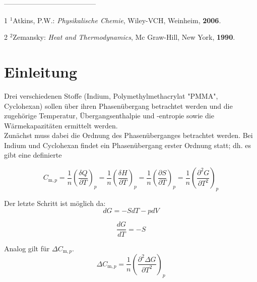 \documentclass[a4paper,12pt,oneside,onecolum,final,openany]{report}
\begin{document}
\begin{titlepage}
\vspace{1.3cm} 
 ---------------------------------------
\begin{tablenotes}\footnotesize  
\item[1] $^1$Atkins, P.W.: \emph{Physikalische Chemie}, Wiley-VCH, Weinheim, \textbf{2006}.
\item[2] $^2$Zemansky: \emph{Heat and Thermodynamics}, Mc Graw-Hill, New York, \textbf{1990}.
\end{tablenotes}

\end{titlepage}


\section{Einleitung}
Drei verschiedenen Stoffe (Indium, Polymethylmethacrylat "PMMA", Cyclohexan) sollen über ihren Phasenübergang betrachtet werden und die zugehörige Temperatur, Übergangsenthalpie und -entropie sowie die Wärmekapazitäten ermittelt werden.\\
Zunächst muss dabei die Ordnung des Phasenüberganges betrachtet werden. Bei Indium und Cyclohexan findet ein Phasenübergang erster Ordnung statt; dh. es gibt eine definierte   





\begin{equation}
C_{\mathrm{m},p} =\frac{1}{n} \left(\frac{\delta Q}{\partial T}\right)_p =\frac{1}{n} \left(\frac{\delta H}{\partial T}\right)_p = \frac{1}{n} \left(\frac{\partial S}{\partial T}\right)_p= \frac{1}{n} \left(\frac{\partial^2 G}{\partial T^2}\right)_p
\end{equation}

Der letzte Schritt ist möglich da:\\

\begin{equation}
dG =-SdT -pdV
\end{equation}

\begin{equation}
\frac{dG}{dT}= -S
\end{equation}

Analog gilt für $\Delta C_{\mathrm{m},p}$.\\

\begin{equation}
\Delta C_{\mathrm{m},p} = \frac{1}{n} \left(\frac{\partial^2 \Delta G}{\partial T^2}\right)_p
\end{equation}
\end{document}
